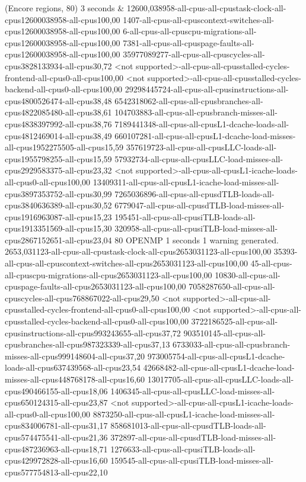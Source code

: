 (Encore regions, 80) 3 seconds
&
12600,038958-all-cpus-all-cpustask-clock-all-cpus12600038958-all-cpus100,00
1407-all-cpus-all-cpuscontext-switches-all-cpus12600038958-all-cpus100,00
6-all-cpus-all-cpuscpu-migrations-all-cpus12600038958-all-cpus100,00
7381-all-cpus-all-cpuspage-faults-all-cpus12600038958-all-cpus100,00
35977089277-all-cpus-all-cpuscycles-all-cpus3828133934-all-cpus30,72
<not supported>-all-cpus-all-cpusstalled-cycles-frontend-all-cpus0-all-cpus100,00
<not supported>-all-cpus-all-cpusstalled-cycles-backend-all-cpus0-all-cpus100,00
29298445724-all-cpus-all-cpusinstructions-all-cpus4800526474-all-cpus38,48
6542318062-all-cpus-all-cpusbranches-all-cpus4822085480-all-cpus38,61
104703883-all-cpus-all-cpusbranch-misses-all-cpus4838397992-all-cpus38,76
7189441348-all-cpus-all-cpusL1-dcache-loads-all-cpus4812469014-all-cpus38,49
660107281-all-cpus-all-cpusL1-dcache-load-misses-all-cpus1952275505-all-cpus15,59
357619723-all-cpus-all-cpusLLC-loads-all-cpus1955798255-all-cpus15,59
57932734-all-cpus-all-cpusLLC-load-misses-all-cpus2929583375-all-cpus23,32
<not supported>-all-cpus-all-cpusL1-icache-loads-all-cpus0-all-cpus100,00
13409311-all-cpus-all-cpusL1-icache-load-misses-all-cpus3897353752-all-cpus30,99
7265036896-all-cpus-all-cpusdTLB-loads-all-cpus3840636389-all-cpus30,52
6779047-all-cpus-all-cpusdTLB-load-misses-all-cpus1916963087-all-cpus15,23
195451-all-cpus-all-cpusiTLB-loads-all-cpus1913351569-all-cpus15,30
320958-all-cpus-all-cpusiTLB-load-misses-all-cpus2867152651-all-cpus23,04
80 OPENMP 1 seconds
1 warning generated.
2653,031123-all-cpus-all-cpustask-clock-all-cpus2653031123-all-cpus100,00
35393-all-cpus-all-cpuscontext-switches-all-cpus2653031123-all-cpus100,00
45-all-cpus-all-cpuscpu-migrations-all-cpus2653031123-all-cpus100,00
10830-all-cpus-all-cpuspage-faults-all-cpus2653031123-all-cpus100,00
7058287650-all-cpus-all-cpuscycles-all-cpus768867022-all-cpus29,50
<not supported>-all-cpus-all-cpusstalled-cycles-frontend-all-cpus0-all-cpus100,00
<not supported>-all-cpus-all-cpusstalled-cycles-backend-all-cpus0-all-cpus100,00
3722186525-all-cpus-all-cpusinstructions-all-cpus993243655-all-cpus37,72
903510145-all-cpus-all-cpusbranches-all-cpus987323339-all-cpus37,13
6733033-all-cpus-all-cpusbranch-misses-all-cpus999148604-all-cpus37,20
973005754-all-cpus-all-cpusL1-dcache-loads-all-cpus637439568-all-cpus23,54
42668482-all-cpus-all-cpusL1-dcache-load-misses-all-cpus448768178-all-cpus16,60
13017705-all-cpus-all-cpusLLC-loads-all-cpus490466155-all-cpus18,06
1406345-all-cpus-all-cpusLLC-load-misses-all-cpus650124315-all-cpus23,87
<not supported>-all-cpus-all-cpusL1-icache-loads-all-cpus0-all-cpus100,00
8873250-all-cpus-all-cpusL1-icache-load-misses-all-cpus834006781-all-cpus31,17
858681013-all-cpus-all-cpusdTLB-loads-all-cpus574475541-all-cpus21,36
372897-all-cpus-all-cpusdTLB-load-misses-all-cpus487236963-all-cpus18,71
1276633-all-cpus-all-cpusiTLB-loads-all-cpus429972828-all-cpus16,60
159545-all-cpus-all-cpusiTLB-load-misses-all-cpus577754813-all-cpus22,10
